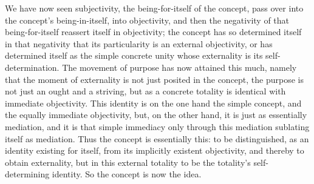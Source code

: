 We have now seen subjectivity,
the being-for-itself of the concept,
pass over into the concept's
being-in-itself, into objectivity,
and then the negativity of that being-for-itself
reassert itself in objectivity;
the concept has so determined itself in that negativity
that its particularity is an external objectivity,
or has determined itself as the simple concrete unity
whose externality is its self-determination.
The movement of purpose has now attained this much,
namely that the moment of externality is
not just posited in the concept,
the purpose is not just an ought and a striving,
but as a concrete totality is
identical with immediate objectivity.
This identity is on the one hand the simple concept,
and the equally immediate objectivity,
but, on the other hand, it is just as essentially mediation,
and it is that simple immediacy only
through this mediation sublating itself as mediation.
Thus the concept is essentially this:
to be distinguished, as an identity existing for itself,
from its implicitly existent objectivity,
and thereby to obtain externality,
but in this external totality to be
the totality's self-determining identity.
So the concept is now the idea.
